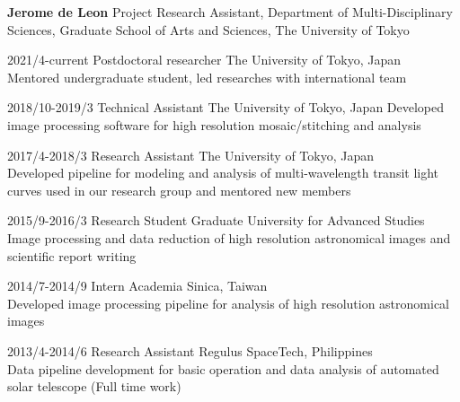 \documentclass[12pt,letterpaper]{article}
\begin{document}
\thispagestyle{empty}\sloppy\sloppypar\raggedbottom

\textbf{\Large Jerome de Leon} 
Project Research Assistant, Department of Multi-Disciplinary Sciences, Graduate School of Arts and Sciences, The University of Tokyo\\[0.5ex]

\begin{list}{}{\cvlist}
    \item 2021/4-current	Postdoctoral researcher	The University of Tokyo, Japan\\
    Mentored undergraduate student, led researches with international team\\
    \item 2018/10-2019/3	Technical Assistant		The University of Tokyo, Japan
    Developed image processing software for high resolution mosaic/stitching and analysis\\
    \item 2017/4-2018/3 	Research Assistant		The University of Tokyo, Japan\\
    Developed pipeline for modeling and analysis of multi-wavelength transit light curves used in our research group and mentored new members\\ 
    \item 2015/9-2016/3 	Research Student		Graduate University for Advanced Studies\\
    Image processing and data reduction of high resolution astronomical images and scientific report writing\\
    \item 2014/7-2014/9		Intern				Academia Sinica, Taiwan\\
    Developed image processing pipeline for analysis of high resolution astronomical images\\
    \item 2013/4-2014/6  	Research Assistant 	Regulus SpaceTech, Philippines\\
    Data pipeline development for basic operation and data analysis of automated solar telescope (Full time work)\\
\end{list}

% 
\end{document}
